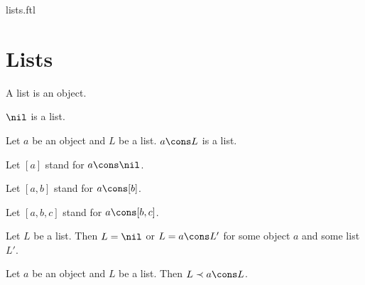 \documentclass{naproche-library}
\begin{document}
\begin{smodule}{lists.ftl}


  \section*{Lists}

  \begin{signature}[forthel,id=LISTS_LISTS_4578620297183232]
    A list is an object.
  \end{signature}

  \begin{signature}[forthel,id=LISTS_LISTS_3703161885818880]
    $\nil$ is a list.
  \end{signature}

  \begin{signature}[forthel,id=LISTS_LISTS_8050301789536256]
    Let $a$ be an object and $L$ be a list.
    $a \cons L$ is a list.

    Let $[a]$ stand for $a \cons \nil$.
    
    Let $[a,b]$ stand for $a \cons [b]$.
    
    Let $[a,b,c]$ stand for $a \cons [b,c]$.
  \end{signature}

  \begin{axiom}[forthel,id=LISTS_LISTS_4512036658964875]
    Let $L$ be a list.
    Then $L = \nil$ or $L = a \cons L'$ for some object $a$ and some list $L'$.
  \end{axiom}

  \begin{axiom}[forthel,id=LISTS_LISTS_1021563255448756]
    Let $a$ be an object and $L$ be a list.
    Then $L \prec a \cons L$.
  \end{axiom}
\end{smodule}
\end{document}
